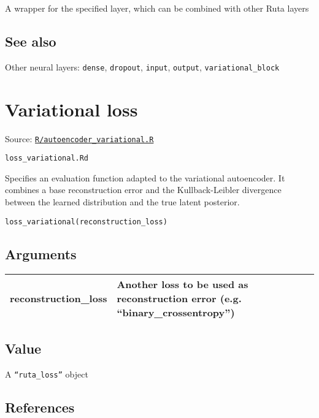 A wrapper for the specified layer, which can be combined with other Ruta
layers

\hypertarget{see-also}{\subsection{\texorpdfstring{\protect\hyperlink{see-also}{}See
also}{See also}}\label{see-also}}

Other neural layers: \texttt{dense}, \texttt{dropout}, \texttt{input},
\texttt{output}, \texttt{variational\_block}

\section{Variational loss}\label{variational-loss}

Source:
\href{https://github.com/fdavidcl/ruta/blob/master/R/autoencoder_variational.R}{\texttt{R/autoencoder\_variational.R}}

\texttt{loss\_variational.Rd}

Specifies an evaluation function adapted to the variational autoencoder.
It combines a base reconstruction error and the Kullback-Leibler
divergence between the learned distribution and the true latent
posterior.

\begin{verbatim}
loss_variational(reconstruction_loss)
\end{verbatim}

\hypertarget{arguments}{\subsection{\texorpdfstring{\protect\hyperlink{arguments}{}Arguments}{Arguments}}\label{arguments}}

\begin{longtable}[c]{@{}>{\small}p{3cm}>{\raggedright}p{12.5cm}@{}}
\toprule
reconstruction\_loss & Another loss to be used as reconstruction error
(e.g. ``binary\_crossentropy'')\tabularnewline
\bottomrule
\end{longtable}

\hypertarget{value}{\subsection{\texorpdfstring{\protect\hyperlink{value}{}Value}{Value}}\label{value}}

A \texttt{``ruta\_loss''} object

\hypertarget{references}{\subsection{\texorpdfstring{\protect\hyperlink{references}{}References}{References}}\label{references}}

